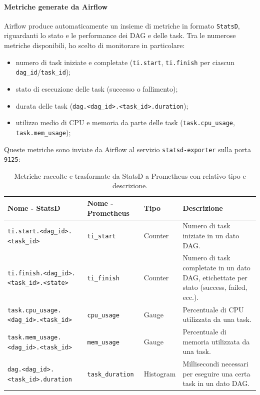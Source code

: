 \paragraph{Metriche generate da Airflow}
Airflow produce automaticamente un insieme di metriche in formato \texttt{StatsD}, riguardanti lo stato e le performance dei DAG e delle task.  
Tra le numerose metriche disponibili, ho scelto di monitorare in particolare:
\begin{itemize}
    \item numero di task iniziate e completate (\texttt{ti.start}, \texttt{ti.finish} per ciascun \texttt{dag\_id}/\texttt{task\_id});
    \item stato di esecuzione delle task (successo o fallimento);
    \item durata delle task (\texttt{dag.<dag\_id>.<task\_id>.duration});
    \item utilizzo medio di CPU e memoria da parte delle task (\texttt{task.cpu\_usage}, \texttt{task.mem\_usage});
\end{itemize}
Queste metriche sono inviate da Airflow al servizio \texttt{statsd-exporter} sulla porta \texttt{9125}:

\begin{table}[h]
\centering
\scriptsize
\begin{tabular}{|l|l|l|p{7cm}|}
\hline
\textbf{Nome - StatsD} & \textbf{Nome - Prometheus} & \textbf{Tipo} & \textbf{Descrizione} \\
\hline
\texttt{ti.start.<dag\_id>.<task\_id>} & \texttt{ti\_start} & Counter & Numero di task iniziate in un dato DAG. \\
\texttt{ti.finish.<dag\_id>.<task\_id>.<state>} & \texttt{ti\_finish} & Counter & Numero di task completate in un dato DAG, etichettate per stato (success, failed, ecc.). \\
\texttt{task.cpu\_usage.<dag\_id>.<task\_id>} & \texttt{cpu\_usage} & Gauge & Percentuale di CPU utilizzata da una task. \\
\texttt{task.mem\_usage.<dag\_id>.<task\_id>} & \texttt{mem\_usage} & Gauge & Percentuale di memoria utilizzata da una task. \\
\texttt{dag.<dag\_id>.<task\_id>.duration} & \texttt{task\_duration} & Histogram & Millisecondi necessari per eseguire una certa task in un dato DAG. \\
\hline
\end{tabular}
\caption{Metriche raccolte e trasformate da StatsD a Prometheus con relativo tipo e descrizione.}
\label{tab:metrics_monitored}
\end{table}




